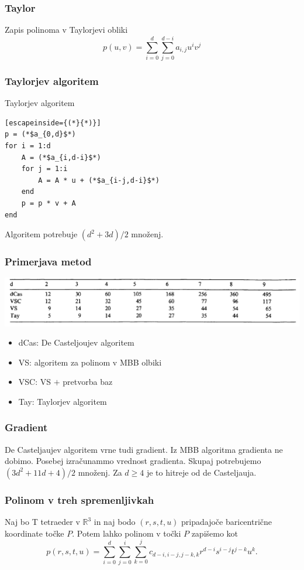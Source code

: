 \documentclass{beamer}
\begin{document}
\begin{frame}
\frametitle{Taylor}
Zapis polinoma v Taylorjevi obliki
$$p(u,v) = \sum_{i = 0}^d{\sum_{j=0}^{d-i}{a_{i,j}u^iv^j }}$$
\end{frame}



\begin{frame}[fragile]
\frametitle{Taylorjev algoritem}

\begin{block}{Taylorjev algoritem}
\begin{lstlisting}[escapeinside={(*}{*)}]
p = (*$a_{0,d}$*)
for i = 1:d
    A = (*$a_{i,d-i}$*)
    for j = 1:i
        A = A * u + (*$a_{i-j,d-i}$*)
    end
    p = p * v + A
end
\end{lstlisting}
\end{block}
Algoritem potrebuje $(d^2+3d)/2$ množenj.

\end{frame}

\begin{frame}
\frametitle{Primerjava metod}

\begin{center}
\includegraphics[width=1.0\linewidth]{tabelca.PNG}
\end{center}

\begin{itemize}
\item dCas: De Casteljoujev algoritem
\item VS: algoritem za polinom v MBB olbiki
\item VSC: VS $+$ pretvorba baz
\item Tay: Taylorjev algoritem
\end{itemize}


\end{frame}


\begin{frame}
\frametitle{Gradient}
De Casteljaujev algoritem vrne tudi gradient. Iz MBB algoritma gradienta ne dobimo. 
Posebej izračunammo vrednost gradienta.
Skupaj potrebujemo $(3d^2 + 11d + 4)/2$ množenj.
Za $d\geq4$ je to hitreje od de Casteljauja. 


\end{frame}


\begin{frame}
\frametitle{Polinom v treh spremenljivkah}
Naj bo T tetraeder v $\mathbb{R}^3$ in naj bodo $(r,s,t,u)$ pripadajoče baricentrične koordinate točke $P$. Potem lahko polinom v točki $P$ zapišemo kot
$$p(r,s,t,u) = \sum_{i=0}^{d}\sum_{j=0}^{i}\sum_{k=0}^{j}c_{d-i,i-j,j-k,k}r^{d-i}s^{i-j}t^{j-k}u^{k}.$$
\end{frame}
\end{document}
